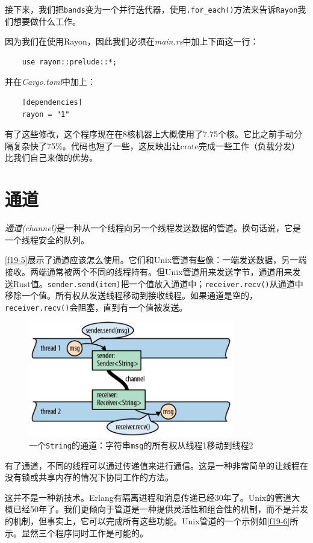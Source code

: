 接下来，我们把\texttt{bands}变为一个并行迭代器，使用\texttt{.for\_each()}方法来告诉\texttt{Rayon}我们想要做什么工作。

因为我们在使用Rayon，因此我们必须在\emph{main.rs}中加上下面这一行：
\begin{verbatim}
    use rayon::prelude::*;
\end{verbatim}
并在\emph{Cargo.toml}中加上：
\begin{verbatim}
    [dependencies]
    rayon = "1"
\end{verbatim}

有了这些修改，这个程序现在在8核机器上大概使用了7.75个核。它比之前手动分隔复杂快了75\%。代码也短了一些，这反映出让crate完成一些工作（负载分发）比我们自己来做的优势。

\section{通道}
\emph{通道(channel)}是一种从一个线程向另一个线程发送数据的管道。换句话说，它是一个线程安全的队列。

\autoref{f19-5}展示了通道应该怎么使用。它们和Unix管道有些像：一端发送数据，另一端接收。两端通常被两个不同的线程持有。但Unix管道用来发送字节，通道用来发送Rust值。\texttt{sender.send(item)}把一个值放入通道中；\texttt{receiver.recv()}从通道中移除一个值。所有权从发送线程移动到接收线程。如果通道是空的，\texttt{receiver.recv()}会阻塞，直到有一个值被发送。

\begin{figure}[htbp]
    \centering
    \includegraphics[width=0.8\textwidth]{../img/f19-5.png}
    \caption{一个\texttt{String}的通道：字符串\texttt{msg}的所有权从线程1移动到线程2}
    \label{f19-5}
\end{figure}

有了通道，不同的线程可以通过传递值来进行通信。这是一种非常简单的让线程在没有锁或共享内存的情况下协同工作的方法。

这并不是一种新技术。Erlang有隔离进程和消息传递已经30年了。Unix的管道大概已经50年了。我们更倾向于管道是一种提供灵活性和组合性的机制，而不是并发的机制，但事实上，它可以完成所有这些功能。Unix管道的一个示例如\autoref{f19-6}所示。显然三个程序同时工作是可能的。

